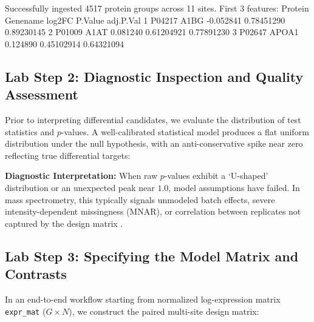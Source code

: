 \documentclass[11pt,twoside,openright]{book}
\begin{document}
\begin{routput}
Successfully ingested 4517 protein groups across 11 sites.
First 3 features:
  Protein Genename    log2FC    P.Value  adj.P.Val
1  P04217     A1BG -0.052841 0.78451290 0.89230145
2  P01009     A1AT  0.081240 0.61204921 0.77891230
3  P02647     APOA1 0.124890 0.45102914 0.64321094
\end{routput}

\subsection{Lab Step 2: Diagnostic Inspection and Quality Assessment}

Prior to interpreting differential candidates, we evaluate the distribution of test statistics and $p$-values. A well-calibrated statistical model produces a flat uniform distribution under the null hypothesis, with an anti-conservative spike near zero reflecting true differential targets:


\begin{notebox}
\textbf{Diagnostic Interpretation:} When raw $p$-values exhibit a `U-shaped' distribution or an unexpected peak near $1.0$, model assumptions have failed. In mass spectrometry, this typically signals unmodeled batch effects, severe intensity-dependent missingness (MNAR), or correlation between replicates not captured by the design matrix \cite{karpievitch2012statistical, lazar2016accounting}.
\end{notebox}

\subsection{Lab Step 3: Specifying the Model Matrix and Contrasts}

In an end-to-end workflow starting from normalized log-expression matrix \texttt{expr\_mat} ($G \times N$), we construct the paired multi-site design matrix:
\end{document}
